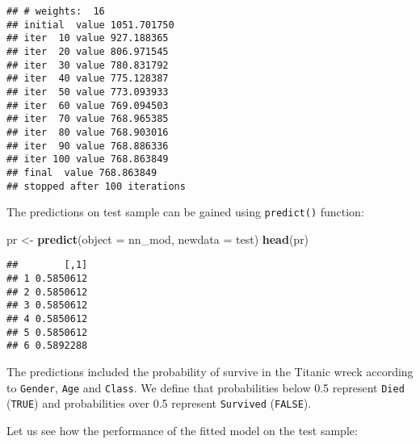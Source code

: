 \documentclass[]{book}
\newenvironment{Shaded}{\begin{snugshade}}{\end{snugshade}}
\newcommand{\KeywordTok}[1]{\textcolor[rgb]{0.13,0.29,0.53}{\textbf{{#1}}}}
\newcommand{\DataTypeTok}[1]{\textcolor[rgb]{0.13,0.29,0.53}{{#1}}}
\newcommand{\DecValTok}[1]{\textcolor[rgb]{0.00,0.00,0.81}{{#1}}}
\newcommand{\StringTok}[1]{\textcolor[rgb]{0.31,0.60,0.02}{{#1}}}
\newcommand{\NormalTok}[1]{{#1}}
\begin{document}
\begin{verbatim}
## # weights:  16
## initial  value 1051.701750 
## iter  10 value 927.188365
## iter  20 value 806.971545
## iter  30 value 780.831792
## iter  40 value 775.128387
## iter  50 value 773.093933
## iter  60 value 769.094503
## iter  70 value 768.965385
## iter  80 value 768.903016
## iter  90 value 768.886336
## iter 100 value 768.863849
## final  value 768.863849 
## stopped after 100 iterations
\end{verbatim}

The predictions on test sample can be gained using \texttt{predict()}
function:

\begin{Shaded}
\begin{Highlighting}[]
\NormalTok{pr <-}\StringTok{ }\KeywordTok{predict}\NormalTok{(}\DataTypeTok{object =} \NormalTok{nn_mod, }\DataTypeTok{newdata =} \NormalTok{test)}
\KeywordTok{head}\NormalTok{(pr)}
\end{Highlighting}
\end{Shaded}

\begin{verbatim}
##        [,1]
## 1 0.5850612
## 2 0.5850612
## 3 0.5850612
## 4 0.5850612
## 5 0.5850612
## 6 0.5892288
\end{verbatim}

The predictions included the probability of survive in the Titanic wreck
according to \texttt{Gender}, \texttt{Age} and \texttt{Class}. We define
that probabilities below 0.5 represent \texttt{Died} (\texttt{TRUE}) and
probabilities over 0.5 represent \texttt{Survived} (\texttt{FALSE}).

\begin{Shaded}
\end{Shaded}

Let us see how the performance of the fitted model on the test sample:

\begin{Shaded}
\end{Shaded}
\end{document}

